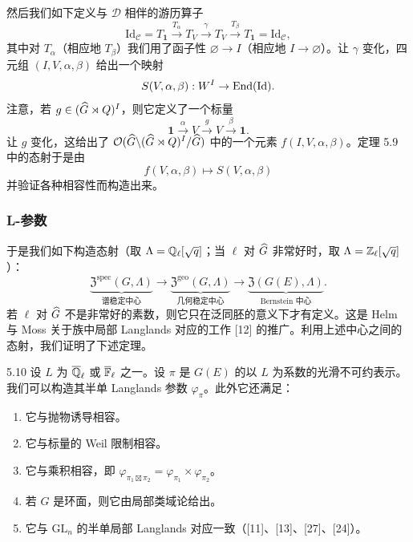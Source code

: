 然后我们如下定义与 $\mathcal{D}$ 相伴的游历算子
\[
\mathrm{Id}_{\mathcal{C}} = T_{\mathbf{1}} \xrightarrow{T_\alpha} T_V \xrightarrow{\gamma} T_V \xrightarrow{T_\beta} T_{\mathbf{1}} = \mathrm{Id}_{\mathcal{C}},
\]
其中对 $T_\alpha$（相应地 $T_\beta$）我们用了函子性 $\varnothing\to I$（相应地 $I\to\varnothing$）。让 $\gamma$ 变化，四元组 $(I,V,\alpha,\beta)$ 给出一个映射
\[
S(V,\alpha,\beta) : W^I \to \operatorname{End}(\mathrm{Id}).
\]
注意，若 $g\in(\widehat{G}\rtimes Q)^I$，则它定义了一个标量
\[
\mathbf{1}\xrightarrow{\ \alpha\ }V\xrightarrow{\ g\ }V\xrightarrow{\ \beta\ }\mathbf{1}.
\]
让 $g$ 变化，这给出了 $\mathcal{O}(\widehat{G}\backslash(\widehat{G}\rtimes Q)^I/\widehat{G})$ 中的一个元素 $f(I,V,\alpha,\beta)$。定理 5.9 中的态射于是由
\[
f(V,\alpha,\beta)\mapsto S(V,\alpha,\beta)
\]
并验证各种相容性而构造出来。

\subsubsection{L-参数}
于是我们如下构造态射（取 $\Lambda=\mathbb{Q}_\ell[\sqrt q]$；当 $\ell$ 对 $\widehat{G}$ 非常好时，取 $\Lambda=\mathbb{Z}_\ell[\sqrt q]$）：
\[
\underbrace{\mathfrak Z^{\mathrm{spec}}(G,\Lambda)}_{\text{谱稳定中心}}
\longrightarrow
\underbrace{\mathfrak Z^{\mathrm{geo}}(G,\Lambda)}_{\text{几何稳定中心}}
\longrightarrow
\underbrace{\mathfrak Z(G(E),\Lambda)}_{\text{Bernstein 中心}}.
\]
若 $\ell$ 对 $\widehat{G}$ 不是非常好的素数，则它只在泛同胚的意义下才有定义。这是 Helm 与 Moss 关于族中局部 Langlands 对应的工作 [12] 的推广。利用上述中心之间的态射，我们证明了下述定理。

\begin{thm}{5.10}\label{thm:a3-5-10}
设 $L$ 为 $\overline{\mathbb{Q}}_\ell$ 或 $\overline{\mathbb{F}}_\ell$ 之一。设 $\pi$ 是 $G(E)$ 的以 $L$ 为系数的光滑不可约表示。我们可以构造其半单 Langlands 参数 $\varphi_\pi$。此外它还满足：
\begin{enumerate}[label=(\arabic*),leftmargin=2.6em,itemsep=0.2em]
\item 它与抛物诱导相容。
\item 它与标量的 Weil 限制相容。
\item 它与乘积相容，即 $\varphi_{\pi_1\boxtimes\pi_2}=\varphi_{\pi_1}\times\varphi_{\pi_2}$。
\item 若 $G$ 是环面，则它由局部类域论给出。
\item 它与 $\mathrm{GL}_n$ 的半单局部 Langlands 对应一致（[11]、[13]、[27]、[24]）。
\end{enumerate}
\end{thm}

